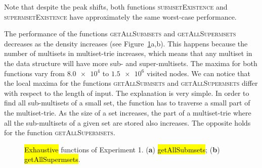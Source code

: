 \documentclass[algorithms,article,accept,pdftex,moreauthors]{Definitions/mdpi}
\begin{document}
Note that despite the peak shifts, both functions \textsc{submsetExistence} and 
\textsc{supermsetExistence} have approximately the same worst-case performance. 

The performance of the functions \textsc{getAllSubmsets} and \textsc{getAllSupermsets} 
decreases as the density increases (see Figure~\ref{fig:5}a,b). 
This happens because the number of multisets in multiset-trie increases, which means 
that any multiset in the data structure will have more sub- and super-multisets. 
The maxima for both functions vary from $\num{8.0e4}$ to $\num{1.5e6}$ visited nodes. 
We can notice that the local maxima for the functions \textsc{getAllSubmsets} and 
\textsc{getAllSupermsets} differ with respect to the length of input. The 
explanation is very simple. In order to find all sub-multisets of a small set, the 
function has to traverse a small part of the multiset-trie. As the size of a set 
increases, the part of a multiset-trie where all the sub-multisets of a given set 
are stored also increases. The opposite holds for the function 
\textsc{getAllSupermsets}.

\begin{figure}[H]

\caption{\hl{Exhaustive} %
 functions of Experiment 1. (\textbf{a}) \hl{getAllSubmsets}; (\textbf{b}) \hl{getAllSupermsets}.\label{fig:5}}
\end{figure}
\end{document}
